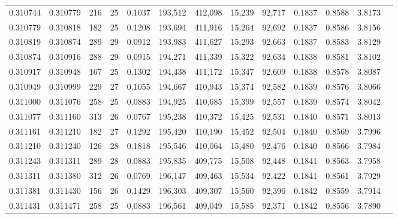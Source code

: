 \begin{tabular}{rrrrrrrrrrrrr}
0.310744 & 0.310779 &   216 &  25 &                                     0.1037 & 193,512 & 412,098 &  15,239 &  92,717 & 0.1837 & 0.8588 & 3.8173 \\
0.310779 & 0.310818 &   182 &  25 &                                     0.1208 & 193,694 & 411,916 &  15,264 &  92,692 & 0.1837 & 0.8586 & 3.8156 \\
0.310819 & 0.310874 &   289 &  29 &                                     0.0912 & 193,983 & 411,627 &  15,293 &  92,663 & 0.1837 & 0.8583 & 3.8129 \\
0.310874 & 0.310916 &   288 &  29 &                                     0.0915 & 194,271 & 411,339 &  15,322 &  92,634 & 0.1838 & 0.8581 & 3.8102 \\
0.310917 & 0.310948 &   167 &  25 &                                     0.1302 & 194,438 & 411,172 &  15,347 &  92,609 & 0.1838 & 0.8578 & 3.8087 \\
0.310949 & 0.310999 &   229 &  27 &                                     0.1055 & 194,667 & 410,943 &  15,374 &  92,582 & 0.1839 & 0.8576 & 3.8066 \\
0.311000 & 0.311076 &   258 &  25 &                                     0.0883 & 194,925 & 410,685 &  15,399 &  92,557 & 0.1839 & 0.8574 & 3.8042 \\
0.311077 & 0.311160 &   313 &  26 &                                     0.0767 & 195,238 & 410,372 &  15,425 &  92,531 & 0.1840 & 0.8571 & 3.8013 \\
0.311161 & 0.311210 &   182 &  27 &                                     0.1292 & 195,420 & 410,190 &  15,452 &  92,504 & 0.1840 & 0.8569 & 3.7996 \\
0.311210 & 0.311240 &   126 &  28 &                                     0.1818 & 195,546 & 410,064 &  15,480 &  92,476 & 0.1840 & 0.8566 & 3.7984 \\
0.311243 & 0.311311 &   289 &  28 &                                     0.0883 & 195,835 & 409,775 &  15,508 &  92,448 & 0.1841 & 0.8563 & 3.7958 \\
0.311311 & 0.311380 &   312 &  26 &                                     0.0769 & 196,147 & 409,463 &  15,534 &  92,422 & 0.1841 & 0.8561 & 3.7929 \\
0.311381 & 0.311430 &   156 &  26 &                                     0.1429 & 196,303 & 409,307 &  15,560 &  92,396 & 0.1842 & 0.8559 & 3.7914 \\
0.311431 & 0.311471 &   258 &  25 &                                     0.0883 & 196,561 & 409,049 &  15,585 &  92,371 & 0.1842 & 0.8556 & 3.7890 \\

\end{tabular}
